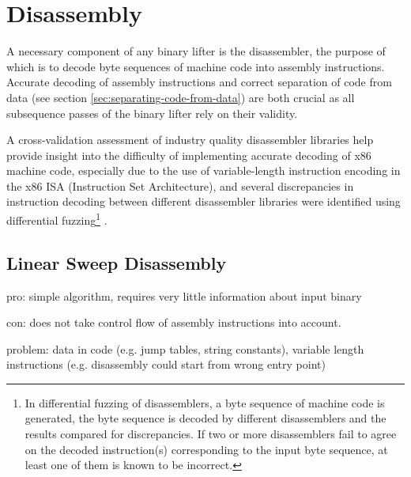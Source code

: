 

\section{Disassembly}

A necessary component of any binary lifter is the disassembler, the purpose of which is to decode byte sequences of machine code into assembly instructions. Accurate decoding of assembly instructions and correct separation of code from data (see section \ref{sec:separating-code-from-data}) are both crucial as all subsequence passes of the binary lifter rely on their validity.

A cross-validation assessment of industry quality disassembler libraries help provide insight into the difficulty of implementing accurate decoding of x86 machine code, especially due to the use of variable-length instruction encoding in the x86 ISA (Instruction Set Architecture), and several discrepancies in instruction decoding between different disassembler libraries were identified using differential fuzzing\footnote{In differential fuzzing of disassemblers, a byte sequence of machine code is generated, the byte sequence is decoded by different disassemblers and the results compared for discrepancies. If two or more disassemblers fail to agree on the decoded instruction(s) corresponding to the input byte sequence, at least one of them is known to be incorrect.} \cite{broken_x86_disassemblers}.


\subsection{Linear Sweep Disassembly}

pro: simple algorithm, requires very little information about input binary

con: does not take control flow of assembly instructions into account.

problem: data in code (e.g. jump tables, string constants), variable length instructions (e.g. disassembly could start from wrong entry point)



